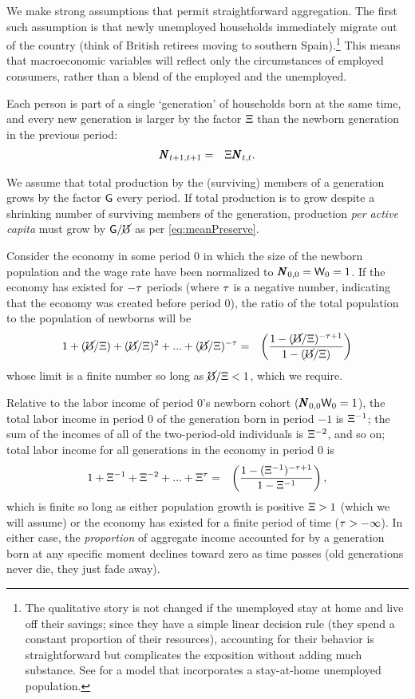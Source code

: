 \message{ !name(TractableBufferStock.tex)}\documentclass{handout}
\begin{document}
We make strong assumptions that permit straightforward aggregation. The first such assumption is that newly unemployed households immediately migrate out of the
country (think of British retirees moving to southern
Spain).\footnote{The qualitative story is not changed if the unemployed stay at home and live off their savings; since they have a simple linear
  decision rule (they spend a constant proportion of their resources),
  accounting for their behavior is straightforward but
  complicates the exposition without adding much substance.  See \cite{cjSOE} for a model that incorporates a stay-at-home unemployed population.}
This means that macroeconomic variables will reflect only the circumstances of 
employed consumers, rather than a blend of the employed and the unemployed.

Each person is part of a single `generation' of households born at the
same time, and every new generation is larger by the factor $\Xi$
than the newborn generation in the previous period:
\begin{eqnarray}
  \pmb{N}_{t+1,t+1} & = & \Xi \pmb{N}_{t,t}
.
\end{eqnarray}

We assume that total production by the (surviving) members of a generation grows by
the factor $\mathsf{G}$ every period.  If total production is to grow
despite a shrinking number of surviving members of the generation, 
production {\it per active capita} must grow by $\mathsf{G}/\cancel{\mho}$ as per \eqref{eq:meanPreserve}.

Consider the economy in some period 0 in which the size of the newborn population
and the wage rate have been normalized to $\pmb{N}_{0,0} = \mathsf{W}_{0} = 1$.  If the economy
has existed for $-\tau$ periods (where $\tau$ is a negative number, indicating that the economy was created before period 0), the ratio of the total population to the population
of newborns will be 
\begin{eqnarray}
  1 + (\cancel{\mho}/\Xi)+ (\cancel{\mho}/\Xi)^{2}+ ... +(\cancel{\mho}/\Xi)^{-\tau} & = & \left(\frac{1-(\cancel{\mho}/\Xi)^{-\tau+1}}{1-(\cancel{\mho}/\Xi)}\right)
\end{eqnarray}
whose limit is a finite number so long as $\cancel{\mho}/\Xi < 1$, which we require.

Relative to the labor income of period 0's newborn cohort ($\pmb{N}_{0,0} \mathsf{W}_{0} = 1$),
the total labor income in period 0 of the generation born in period $-1$ is $\Xi^{-1}$; the sum of the incomes of all of the two-period-old individuals is $\Xi^{-2}$, and so on; total labor income for all generations in the economy in period 0 is
\begin{eqnarray}
  1 + \Xi^{-1}+ \Xi^{-2}+ ...+\Xi^{\tau} & = & \left(\frac{1-(\Xi^{-1})^{-\tau+1}}{1-\Xi^{-1}}\right) \label{eq:LabIncTot}
,
\end{eqnarray}
which is finite so long as either population growth is positive $\Xi>1$ (which 
we will assume) or 
the economy has existed for a finite period of time ($\tau > -\infty$).  
In either case, the {\it proportion} of aggregate income accounted for by a generation
born at any specific moment declines toward zero as time passes (old generations never die,
they just fade away).
\end{document}
